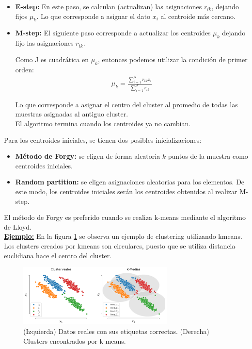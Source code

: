 \begin{itemize}
    \item \textbf{E-step:} En este paso, se calculan (actualizan) las asignaciones $r_{ik}$, dejando fijos $\mu_k$. Lo que corresponde a asignar el dato $x_i$ al centroide más cercano.
    \item \textbf{M-step:} El siguiente paso corresponde a actualizar los centroides $\mu_k$ dejando fijo las asignaciones $r_{ik}$.
    
    Como J es cuadrática en $\mu_k$, entonces podemos utilizar la condición de primer orden:
    \begin{align}
        \mu_k = \frac{\sum_{i=1}^N r_{ik}x_i}{\sum_{i=1}^N r_{ik}}
    \end{align}
    
    Lo que corresponde a asignar el centro del cluster al promedio de todas las muestras asignadas al antiguo cluster.\\
    
    El algoritmo termina cuando los centroides ya no cambian.
\end{itemize}


Para los centroides iniciales, se tienen dos posibles inicializaciones:

\begin{itemize}
	\item \textbf{Método de Forgy:} se eligen de forma aleatoria $k$ puntos de la muestra como centroides iniciales.
	\item \textbf{Random partition:} se eligen asignaciones aleatorias para los elementos. De este modo, los centroides iniciales serán los centroides obtenidos al realizar M-step.
\end{itemize}

El método de Forgy es preferido cuando se realiza k-means mediante el algoritmo de Lloyd.\\

\underline{\textbf{Ejemplo:}} En la figura \ref{fig:kmeans} se observa un ejemplo de clustering utilizando kmeans. Los clusters creados por kmeans son circulares, puesto que se utiliza distancia euclidiana hace el centro del cluster.\\

\begin{figure}[h]
  \centering
  \includegraphics[width=0.7\textwidth]{img/cap6_k_medias}
  \caption{(Izquierda) Datos reales con sus etiquetas correctas. (Derecha) Clusters encontrados por k-means.}
  \label{fig:kmeans}
\end{figure}

